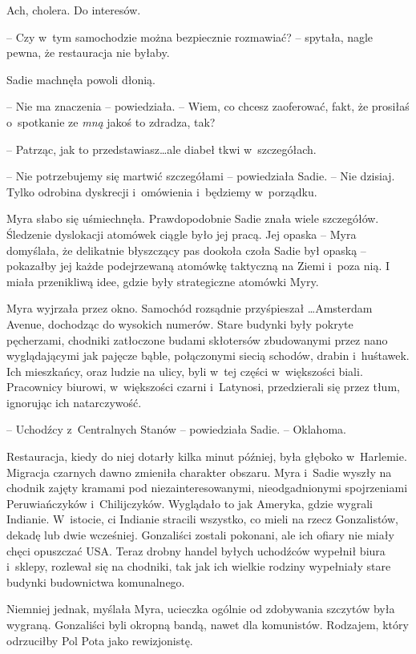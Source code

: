 \documentclass[oneside,polish,11pt,sfheadings]{mwbk}
\begin{document}
Ach, cholera. Do interesów.

-- Czy w~tym samochodzie można bezpiecznie rozmawiać? -- spytała, nagle
pewna, że restauracja nie byłaby.

Sadie machnęła powoli dłonią. 

-- Nie ma znaczenia -- powiedziała. -- Wiem,
co chcesz zaoferować, fakt, że prosiłaś o~spotkanie ze \textit{mną} jakoś
to zdradza, tak?

-- Patrząc, jak to przedstawiasz\ldots ale diabeł tkwi w~szczegółach.

-- Nie potrzebujemy się martwić szczegółami -- powiedziała Sadie. -- Nie
dzisiaj. Tylko odrobina dyskrecji i~omówienia i~będziemy w~porządku.

Myra słabo się uśmiechnęła. Prawdopodobnie Sadie znała wiele szczegółów.
Śledzenie dyslokacji atomówek ciągle było jej pracą. Jej opaska -- Myra
domyślała, że delikatnie błyszczący pas dookoła czoła Sadie był opaską -- pokazałby jej każde podejrzewaną atomówkę taktyczną na Ziemi i~poza nią.
I miała przenikliwą idee, gdzie były strategiczne atomówki Myry.

Myra wyjrzała przez okno. Samochód rozsądnie przyśpieszał \ldots Amsterdam
Avenue, dochodząc do wysokich numerów. Stare budynki były pokryte
pęcherzami, chodniki zatłoczone budami skłotersów zbudowanymi przez nano
wyglądającymi jak pajęcze bąble, połączonymi siecią schodów, drabin i~huśtawek. Ich mieszkańcy, oraz ludzie na ulicy, byli w~tej części w~większości biali. Pracownicy biurowi, w~większości czarni i~Latynosi,
przedzierali się przez tłum, ignorując ich natarczywość.

-- Uchodźcy z~Centralnych Stanów -- powiedziała Sadie. -- Oklahoma.

Restauracja, kiedy do niej dotarły kilka minut później, była głęboko w~Harlemie. Migracja czarnych dawno zmieniła charakter obszaru. Myra i~Sadie wyszły na chodnik zajęty kramami pod niezainteresowanymi,
nieodgadnionymi spojrzeniami Peruwiańczyków i~Chilijczyków. Wyglądało to
jak Ameryka, gdzie wygrali Indianie. W~istocie, ci Indianie stracili
wszystko, co mieli na rzecz Gonzalistów, dekadę lub dwie wcześniej.
Gonzaliści zostali pokonani, ale ich ofiary nie miały chęci opuszczać
USA. Teraz drobny handel byłych uchodźców wypełnił biura i~sklepy,
rozlewał się na chodniki, tak jak ich wielkie rodziny wypełniały stare
budynki budownictwa komunalnego.

Niemniej jednak, myślała Myra, ucieczka ogólnie od zdobywania szczytów
była wygraną. Gonzaliści byli okropną bandą, nawet dla komunistów.
Rodzajem, który odrzuciłby Pol Pota jako rewizjonistę.
\end{document}
